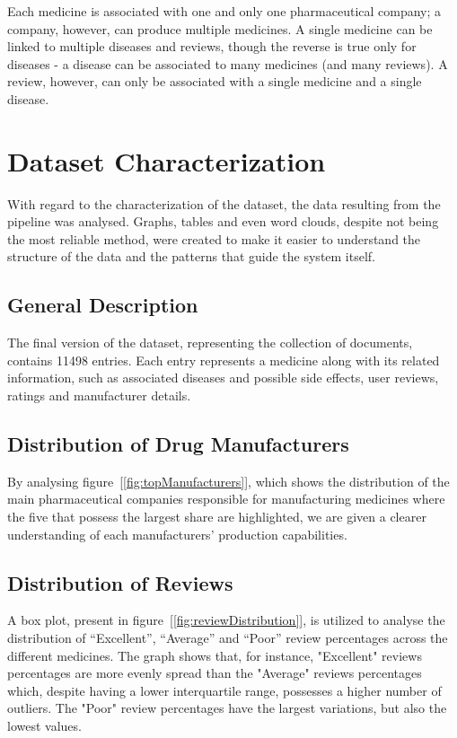 \documentclass[sigconf]{acmart}
\begin{document}
Each medicine is associated with one and only one pharmaceutical company; a company, however, can produce multiple medicines. A single medicine can be linked to multiple diseases and reviews, though the reverse is true only for diseases - a disease can be associated to many medicines (and many reviews). A review, however, can only be associated with a single medicine and a single disease.

\section{Dataset Characterization}

With regard to the characterization of the dataset, the data resulting from the pipeline was analysed. Graphs, tables and even word clouds, despite not being the most reliable method, were created to make it easier to understand the structure of the data and the patterns that guide the system itself.

\subsection{General Description}

The final version of the dataset, representing the collection of documents, contains 11498 entries. Each entry represents a medicine along with its related information, such as associated diseases and possible side effects, user reviews, ratings and manufacturer details.

\subsection{Distribution of Drug Manufacturers}

By analysing figure~[\ref{fig:topManufacturers}], which shows the distribution of the main pharmaceutical companies responsible for manufacturing medicines where the five that possess the largest share are highlighted, we are given a clearer understanding of each manufacturers' production capabilities.

\subsection{Distribution of Reviews}

A box plot, present in figure~[\ref{fig:reviewDistribution}], is utilized to analyse the distribution of “Excellent”, “Average” and “Poor” review percentages across the different medicines. The graph shows that, for instance, "Excellent" reviews percentages are more evenly spread than the "Average" reviews percentages which, despite having a lower interquartile range\cite{iqrange}, possesses a higher number of outliers. The "Poor" review percentages have the largest variations, but also the lowest values. 
\end{document}
